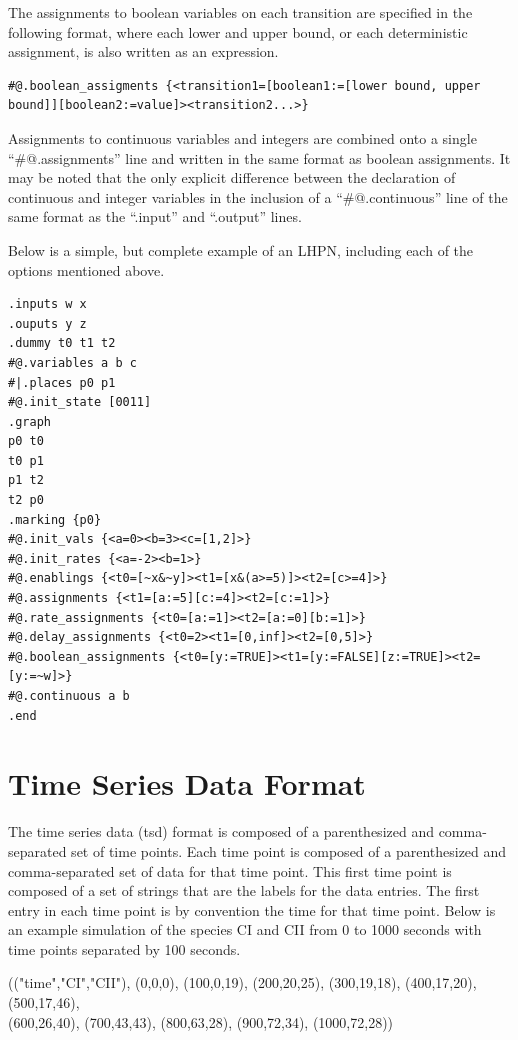 \documentclass[titlepage,11pt]{article}
\begin{document}
The assignments to boolean variables on each transition are specified in the
following format, where each lower and upper bound, or each deterministic
assignment, is also written as an expression.

\begin{verbatim}
#@.boolean_assigments {<transition1=[boolean1:=[lower bound, upper bound]][boolean2:=value]><transition2...>}
\end{verbatim}

Assignments to continuous variables and integers are combined onto a single
``\#@.assignments'' line and written  in the same format as boolean assignments.
It may be noted that the only explicit difference between the declaration of
continuous and integer variables in the inclusion of a ``\#@.continuous'' line
of the same format as the ``.input'' and ``.output'' lines.

\noindent
Below is a simple, but complete example of an LHPN, including each of the 
options mentioned above.

\begin{verbatim}
.inputs w x
.ouputs y z
.dummy t0 t1 t2
#@.variables a b c
#|.places p0 p1
#@.init_state [0011]
.graph
p0 t0
t0 p1
p1 t2
t2 p0
.marking {p0}
#@.init_vals {<a=0><b=3><c=[1,2]>}
#@.init_rates {<a=-2><b=1>}
#@.enablings {<t0=[~x&~y]><t1=[x&(a>=5)]><t2=[c>=4]>}
#@.assignments {<t1=[a:=5][c:=4]><t2=[c:=1]>}
#@.rate_assignments {<t0=[a:=1]><t2=[a:=0][b:=1]>}
#@.delay_assignments {<t0=2><t1=[0,inf]><t2=[0,5]>}
#@.boolean_assignments {<t0=[y:=TRUE]><t1=[y:=FALSE][z:=TRUE]><t2=[y:=~w]>}
#@.continuous a b
.end
\end{verbatim}

\section{\label{TSD}Time Series Data Format}

\noindent
The time series data (tsd) format is composed of a
parenthesized and comma-separated set of time points. Each time
point is composed of a parenthesized and comma-separated set of
data for that time point. This first time point is composed of a
set of strings that are the labels for the data entries. The
first entry in each time point is by convention the time for that
time point. Below is an example simulation of the species CI and
CII from 0 to 1000 seconds with time points separated by 100
seconds. 

(("time","CI","CII"), (0,0,0), (100,0,19), (200,20,25), (300,19,18),
(400,17,20), (500,17,46), \\
(600,26,40), (700,43,43), (800,63,28), (900,72,34), (1000,72,28))
\end{document}
